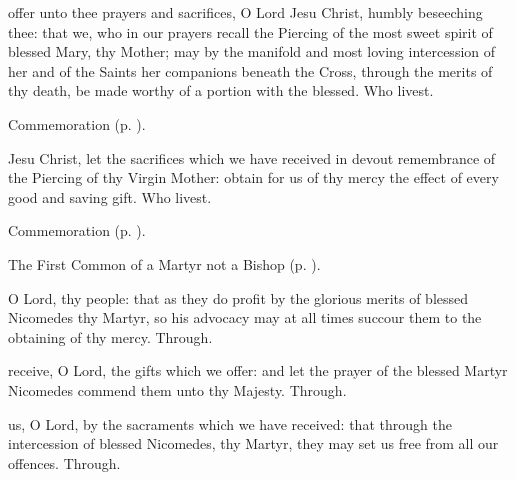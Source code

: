
\secret\label{SevenSorrowsSecret}
 offer unto thee prayers and sacrifices, O Lord Jesu Christ, humbly beseeching thee: that we, who in our prayers recall the Piercing of the most sweet spirit of blessed Mary, thy Mother; may by the manifold and most loving intercession of her and of the Saints her companions beneath the Cross, through the merits of thy death, be made worthy of a portion with the blessed. Who livest.

\begin{rubric}
	 Commemoration  (p. \pageref{NicomedesSecret}).
\end{rubric}


\postcommunion\label{SevenSorrowsPostcommunion}
 Jesu Christ, let the sacrifices which we have received in devout remembrance of the Piercing of thy Virgin Mother: obtain for us of thy mercy the effect of every good and saving gift. Who livest.

\begin{rubric}
	 Commemoration  (p. \pageref{NicomedesPostcommunion}).
\end{rubric}




\begin{rubric}
	The First Common of a Martyr not a Bishop (p. \pageref{CommonMartyrNotBishopI}).
\end{rubric}

\collect\label{NicomedesCollect}
 O Lord, thy people: that as they do profit by the glorious merits of blessed Nicomedes thy Martyr, so his advocacy may at all times succour them to the obtaining of thy mercy. Through.

\secret\label{NicomedesSecret}
 receive, O Lord, the gifts which we offer: and let the prayer of the blessed Martyr Nicomedes commend them unto thy Majesty. Through.

\postcommunion\label{NicomedesPostcommunion}
 us, O Lord, by the sacraments which we have received: that through the intercession of blessed Nicomedes, thy Martyr, they may set us free from all our offences. Through.


